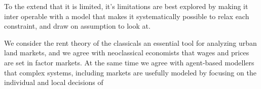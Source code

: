 {To the extend that it is limited, it's limitations are best explored by making it inter operable with a model that makes it systematically possible to relax each constraint, and draw on assumption to look at.


We consider the rent theory of the classicals an essential tool for analyzing urban land markets, and we agree with neoclassical economists that wages and prices are set in factor markets. At the same time we agree with agent-based modellers that complex systems, including markets are usefully modeled by focusing on the individual and local decisions of %













}
